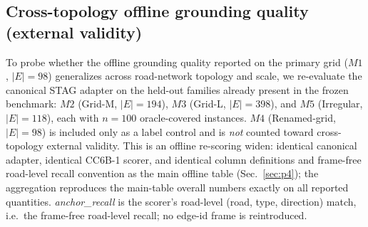 
\subsection{Cross-topology offline grounding quality (external validity)}
\label{app:r4-cross-topology}

To probe whether the offline grounding quality reported on the primary grid
($M1$, $|E|{=}98$) generalizes across road-network topology and scale, we
re-evaluate the canonical STAG adapter on the held-out families already present
in the frozen benchmark: $M2$ (Grid-M, $|E|{=}194$), $M3$ (Grid-L, $|E|{=}398$),
and $M5$ (Irregular, $|E|{=}118$), each with $n{=}100$ oracle-covered instances.
$M4$ (Renamed-grid, $|E|{=}98$) is included only as a label control and is
\emph{not} counted toward cross-topology external validity. This is an offline
re-scoring widen: identical canonical adapter, identical CC6B-1 scorer, and
identical column definitions and frame-free road-level recall convention as the
main offline table (Sec.~\ref{sec:p4}); the aggregation reproduces the main-table
overall numbers exactly on all reported quantities. \emph{anchor\_recall} is the
scorer's road-level (road, type, direction) match, i.e.\ the frame-free road-level
recall; no edge-id frame is reintroduced.

